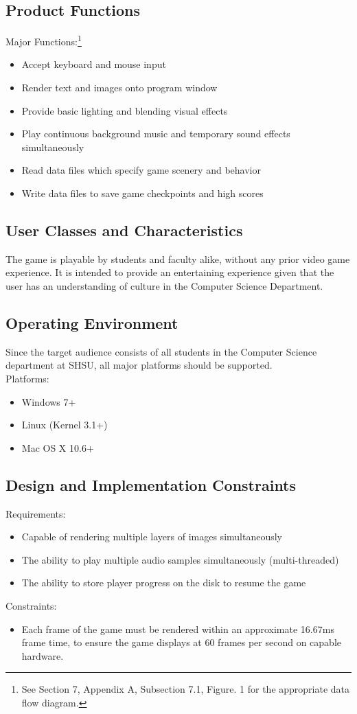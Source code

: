 \documentclass{article}
\begin{document}
	\subsection{Product Functions}
		Major Functions:\footnote{See Section 7, Appendix A, Subsection 7.1, Figure. 1 for the appropriate data flow diagram.}
		\begin{itemize}
			\item Accept keyboard and mouse input 
			\item Render text and images onto program window
			\item Provide basic lighting and blending visual effects
			\item Play continuous background music and temporary sound effects simultaneously
			\item Read data files which specify game scenery and behavior
			\item Write data files to save game checkpoints and high scores
		\end{itemize}
	
	\subsection{User Classes and Characteristics}
		The game is playable by students and faculty alike, without any prior video game experience. It is intended to provide an entertaining experience given that the user has an understanding of culture in the Computer Science Department. 
	
	\subsection{Operating Environment}
		Since the target audience consists of all students in the Computer Science department at SHSU, all major platforms should be supported. \bigskip \\
		Platforms:
		\begin{itemize}
			\item Windows 7+
			\item Linux (Kernel 3.1+)
			\item Mac OS X 10.6+
		\end{itemize}
	
	\subsection{Design and Implementation Constraints}
		Requirements:
		\begin{itemize}
			\item Capable of rendering multiple layers of images simultaneously
			\item The ability to play multiple audio samples simultaneously (multi-threaded)
			\item The ability to store player progress on the disk to resume the game
		\end{itemize}
		Constraints:
		\begin{itemize}
			\item Each frame of the game must be rendered within an approximate 16.67ms frame time, to ensure the game displays at 60 frames per second on capable hardware.
		\end{itemize}
	
\end{document}
